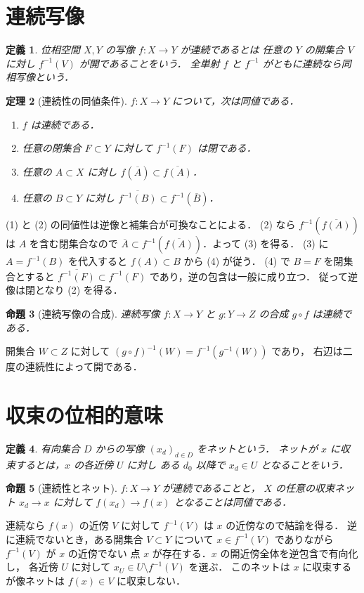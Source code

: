 \documentclass[a5paper,10pt,onecolumn]{jsarticle}
\makeatletter
\theoremstyle{mathnotetheorem}
\newtheorem{theorem}{定理}[section]
\newtheorem{definition}[theorem]{定義}
\newtheorem{proposition}[theorem]{命題}
\renewcommand{\proofname}{証明}
\renewenvironment{proof}[1][\proofname]{%
  \par\pushQED{\qed}\normalfont\topsep4\p@\@plus2\p@\relax
  \trivlist\item[\hskip\labelsep\bfseries #1]\ignorespaces
}{\popQED\endtrivlist\@endpefalse}
\makeatother
\begin{document}
\section{連続写像}
\begin{definition}
位相空間 $X,Y$ の写像 $f:X\to Y$ が連続であるとは
任意の $Y$ の開集合 $V$ に対し $f^{-1}(V)$ が開であることをいう．
全単射 $f$ と $f^{-1}$ がともに連続なら同相写像という．
\end{definition}
\begin{theorem}[連続性の同値条件]\label{thm:continuity}
$f:X\to Y$ について，次は同値である．
\begin{enumerate}
\item $f$ は連続である．
\item 任意の閉集合 $F\subset Y$ に対して $f^{-1}(F)$ は閉である．
\item 任意の $A\subset X$ に対し $f(\overline A)\subset\overline{f(A)}$．
\item 任意の $B\subset Y$ に対し
 $\overline{f^{-1}(B)}\subset f^{-1}(\overline B)$．
\end{enumerate}
\end{theorem}
\begin{proof}
(1) と (2) の同値性は逆像と補集合が可換なことによる．
(2) なら $f^{-1}(\overline{f(A)})$ は $A$ を含む閉集合なので
$\overline A\subset f^{-1}(\overline{f(A)})$．よって (3) を得る．
(3) に $A=f^{-1}(B)$ を代入すると
$f(A)\subset B$ から (4) が従う．
(4) で $B=F$ を閉集合とすると
$\overline{f^{-1}(F)}\subset f^{-1}(F)$ であり，逆の包含は一般に成り立つ．
従って逆像は閉となり (2) を得る．
\end{proof}
\begin{proposition}[連続写像の合成]
連続写像 $f:X\to Y$ と $g:Y\to Z$ の合成 $g\circ f$ は連続である．
\end{proposition}
\begin{proof}
開集合 $W\subset Z$ に対して
$(g\circ f)^{-1}(W)=f^{-1}(g^{-1}(W))$ であり，
右辺は二度の連続性によって開である．
\end{proof}
\section{収束の位相的意味}
\begin{definition}
有向集合 $D$ からの写像 $(x_d)_{d\in D}$ をネットという．
ネットが $x$ に収束するとは，$x$ の各近傍 $U$ に対し
ある $d_0$ 以降で $x_d\in U$ となることをいう．
\end{definition}
\begin{proposition}[連続性とネット]
$f:X\to Y$ が連続であることと，
$X$ の任意の収束ネット $x_d\to x$ に対して
$f(x_d)\to f(x)$ となることは同値である．
\end{proposition}
\begin{proof}
連続なら $f(x)$ の近傍 $V$ に対して
$f^{-1}(V)$ は $x$ の近傍なので結論を得る．
逆に連続でないとき，ある開集合 $V\subset Y$ について
$x\in f^{-1}(V)$ でありながら $f^{-1}(V)$ が $x$ の近傍でない
点 $x$ が存在する．$x$ の開近傍全体を逆包含で有向化し，
各近傍 $U$ に対して
$x_U\in U\setminus f^{-1}(V)$ を選ぶ．
このネットは $x$ に収束するが像ネットは $f(x)\in V$ に収束しない．
\end{proof}
\end{document}
